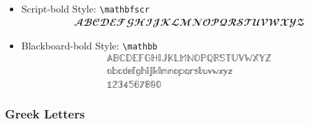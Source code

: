 \documentclass[
	12pt, 
	]{article}
\numberwithin{equation}{section}
\newcommand{\com}[1]{\texttt{\textbackslash #1}}
\theoremstyle{definition}
\theoremstyle{plain}
\theoremstyle{plain}
\theoremstyle{plain}
\begin{document}
\begin{itemize}
	\item Script-bold Style: \com{mathbfscr}
	\begin{gather*}
		\mathbfscr{
			A B C D E F G H I J K L M N O P Q R S T U V W X Y Z
		}
	\end{gather*}
	
	\item Blackboard-bold Style: \com{mathbb}
	\begin{gather*}
		\mathbb{
			A B C D E F G H I J K L M N O P Q R S T U V W X Y Z
		}\\
		\mathbb{
			a b c d e f g h i j k l m n o p q r s t u v w x y z
		}\\
		\mathbb{
			1 2 3 4 5 6 7 8 9 0
		}
	\end{gather*}
	
\end{itemize}

\newpage

\subsubsection{Greek Letters}

\vspace*{0.5cm}
\end{document}
